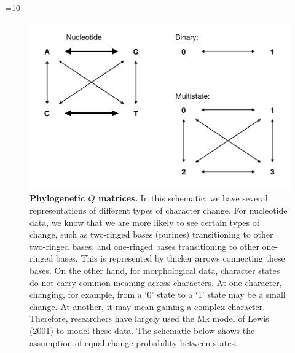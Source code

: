 \ifnum\value{num}=10{
\begin{figure}
\centering
\includegraphics[width=\textwidth]{Cambridge-Elements/manuscript.R2/submitted_figs//figure3}
\caption{\footnotesize\textbf{Phylogenetic $Q$ matrices.}
In this schematic, we have several representations of different types of character change.
For nucleotide data, we know that we are more likely to see certain types of change, such as two-ringed bases (purines) transitioning to other two-ringed bases, and one-ringed bases transitioning to other one-ringed bases.
This is represented by thicker arrows connecting these bases.
On the other hand, for morphological data, character states do not carry common meaning across characters.
At one character, changing, for example, from a `0' state to a `1' state may be a small change.
At another, it may mean gaining a complex character.
Therefore, researchers have largely used the Mk model of Lewis (2001) to model these data.
The schematic below shows the assumption of equal change probability between states.
}
\label{fig:Q}
\end{figure} }\else{}\fi

